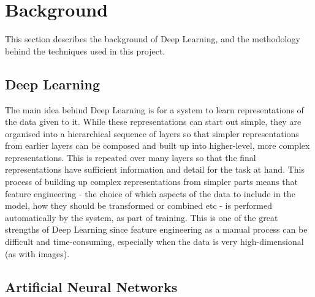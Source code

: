 \documentclass[11pt]{article} %
\theoremstyle{plain}
\theoremstyle{definition}
\begin{document}


\newpage
\section{Background}
This section describes the background of Deep Learning, and the methodology behind the techniques used in this project.

\subsection{Deep Learning}
The main idea behind Deep Learning is for a system to learn representations of the data given to it. While these representations can start out simple, they are organised into a hierarchical sequence of layers so that simpler representations from earlier layers can be composed and built up into higher-level, more complex representations. This is repeated over many layers so that the final representations have sufficient information and detail for the task at hand. This process of building up complex representations from simpler parts means that feature engineering - the choice of which aspects of the data to include in the model, how they should be transformed or combined etc - is performed automatically by the system, as part of training. This is one of the great strengths of Deep Learning since feature engineering as a manual process can be difficult and time-consuming, especially when the data is very high-dimensional (as with images).       

\subsection{Artificial Neural Networks}
\end{document}
